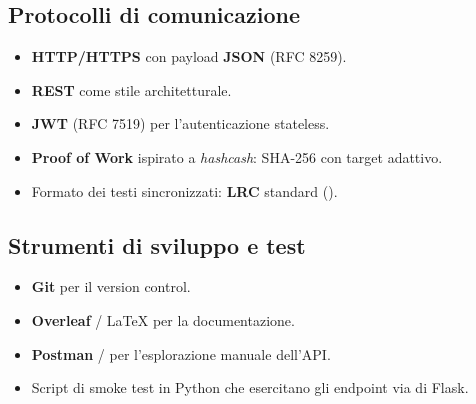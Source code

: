 \subsection{Protocolli di comunicazione}
\begin{itemize}
    \item \textbf{HTTP/HTTPS} con payload \textbf{JSON} (RFC 8259).
    \item \textbf{REST} come stile architetturale.
    \item \textbf{JWT} (RFC 7519) per l'autenticazione stateless.
    \item \textbf{Proof of Work} ispirato a \emph{hashcash}: SHA-256 con
    target adattivo.
    \item Formato dei testi sincronizzati: \textbf{LRC} standard
    ().
\end{itemize}

\subsection{Strumenti di sviluppo e test}
\begin{itemize}
    \item \textbf{Git} per il version control.
    \item \textbf{Overleaf} / \LaTeX{} per la documentazione.
    \item \textbf{Postman} /  per l'esplorazione manuale dell'API.
    \item Script di smoke test in Python che esercitano gli endpoint via
     di Flask.
\end{itemize}
